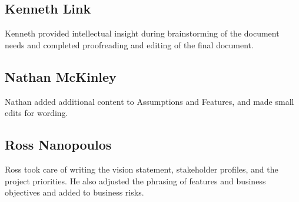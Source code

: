 \documentclass[letter]{scrartcl}
\begin{document}
\subsection{Kenneth Link}
Kenneth provided intellectual insight during brainstorming of the document needs and completed proofreading and editing of the final document.
\subsection{Nathan McKinley}
Nathan added additional content to Assumptions and Features, and made small edits for wording.
\subsection{Ross Nanopoulos}
Ross took care of writing the vision statement, stakeholder profiles, and the project priorities.  He also adjusted the phrasing of features and business objectives and added to business risks.
\end{document}
